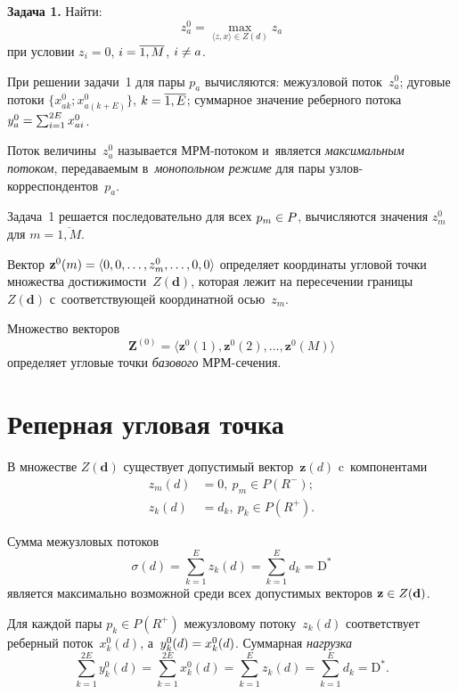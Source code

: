 \begin{multicols}{2}
\noindent
\textbf{Задача 1.} Найти:
$$
z_a^0=\max\limits_{\langle z,x\rangle \in Z(d)} z_a
$$
при условии $z_{i}=0$, $i\hm=\overline{1,M}$, $i\hm\ne a$.

\smallskip

При решении задачи~1 для пары $p_{a}$ вы\-чис\-ля\-ют\-ся: межузловой
поток~$z_a^0$; дуговые потоки $\{x^{0}_{ak};x^{0}_{a(k+E)}\}$,
$k\hm=\overline{1,E}$; суммарное значение реберного
потока~$y_{a}^{0}\hm=\sum\nolimits_{i=1}^{2E} {x}_{ai}^{0}$.

Поток величины~$z_a^0$ называется МРМ-по\-то\-ком и~является
\textit{максимальным потоком}, пе\-ре\-да\-ва\-емым в~\textit{монопольном
режиме} для пары уз\-лов-кор\-рес\-пон\-ден\-тов~$p_{a}$.

Задача~1 решается последовательно для всех $p_{m}\hm\in P$,
вы\-чис\-ля\-ют\-ся значения $
z_{m}^{0}$ для $m=\overline {1,M}.$

Вектор $\mathbf{z}^{0}(m)\hm=\langle 0, 0, \dots,z_m^0,
\dots,0,0\rangle$ определяет координаты угловой точ\-ки множества
до\-сти\-жи\-мости~$Z(\mathbf{d})$, которая лежит на пересечении
границы~$Z(\mathbf{d})$ с~со\-от\-вет\-ст\-ву\-ющей координатной
\mbox{осью}~$z_{m}$.

Множество векторов
\begin{equation*}
\mathbf{Z}^{(0)}=\langle \mathbf{z}^{0}(1),
\mathbf{z}^{0}(2), \dots, \mathbf{z}^0(M)\rangle
\end{equation*}
определяет угловые точки \textit{базового} МРМ-се\-че\-ния.


\section{Реперная угловая точка}

В множестве $Z(\mathbf{d})$ существует допустимый вектор~$\mathbf{z}(d)$ c~компонентами
\begin{align*}
z_{m}(d)&=0,\ p_{m}\in P(R^{-});\\
z_{k}(d)&=d_{k},\ p_{k}\in P(R^{+}).
\end{align*}

Сумма межузловых потоков
$$
\sigma(d)=\sum\limits_{k=1}^Ez_{k}(d)= \sum\limits_{k=1}^E d_{k}=\mathrm{D}^*
$$
является максимально возможной среди всех до\-пус\-ти\-мых век\-то\-ров
$\mathbf{z}\hm\in Z(\mathbf{d})$.

Для каждой пары $p_{k}\in P(R^{+})$ межузловому потоку~$z_{k}(d)$
соответствует реберный поток~$x^{0}_{k}(d)$, 
а~$y^{0}_{k}(d)\hm=x^{0}_{k}(d)$. Суммарная \textit{нагрузка}
$$
\sum\limits_{k=1}^{2E} y^{0}_{k}(d)= \sum\limits_{k=1}^{2E}
 x^{0}_{k}(d)=\sum\limits_{k=1}^E z_{k}(d)=
\sum\limits_{k=1}^E d_{k}=\mathrm{D}^*.
$$


\end{multicols}
